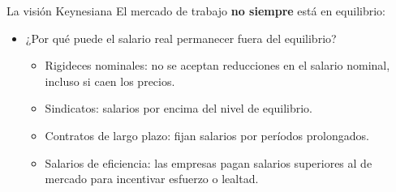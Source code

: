 \documentclass{beamer}
\begin{document}
\begin{frame}{La visión Keynesiana}
\vspace{1mm}
    \small El mercado de trabajo \textbf{no siempre} está en equilibrio:
    \begin{itemize}
       \small \item ¿Por qué puede el salario real permanecer fuera del equilibrio?
        \begin{itemize}
         \footnotesize \item Rigideces nominales: no se aceptan reducciones en el salario nominal, incluso si caen los precios.
          \footnotesize  \item Sindicatos: salarios por encima del nivel de equilibrio.
          \footnotesize  \item Contratos de largo plazo: fijan salarios por períodos prolongados.
          \footnotesize  \item Salarios de eficiencia: las empresas pagan salarios superiores al de mercado para incentivar esfuerzo o lealtad.
       \end{itemize}
    \end{itemize}

    \begin{center}
    \begin{figure}[H]
    \begin{center}
    \end{center}
    \end{figure}
    \end{center}  
\end{frame}
\end{document}
